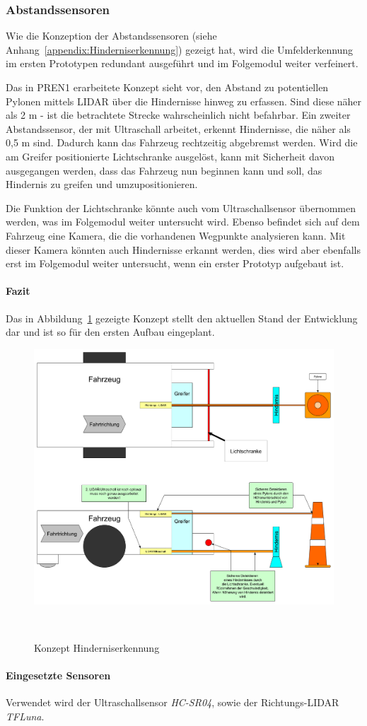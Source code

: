 \documentclass[main.tex]{subfiles} %
\begin{document}

\subsubsection{Abstandssensoren}

Wie die Konzeption der Abstandssensoren (siehe
Anhang~\ref{appendix:Hinderniserkennung}) gezeigt hat, wird die Umfelderkennung
im ersten Prototypen redundant ausgeführt und im Folgemodul weiter verfeinert.

Das in PREN1 erarbeitete Konzept sieht vor, den Abstand zu potentiellen Pylonen
mittels LIDAR über die Hindernisse hinweg zu erfassen. Sind diese näher als 2 m
- ist die betrachtete Strecke wahrscheinlich nicht befahrbar. Ein zweiter
Abstandssensor, der mit Ultraschall arbeitet, erkennt Hindernisse, die näher
als 0,5 m sind. Dadurch kann das Fahrzeug rechtzeitig abgebremst werden. Wird
die am Greifer positionierte Lichtschranke ausgelöst, kann mit Sicherheit davon
ausgegangen werden, dass das Fahrzeug nun beginnen kann und soll, das Hindernis
zu greifen und umzupositionieren.

Die Funktion der Lichtschranke könnte auch vom Ultraschallsensor übernommen
werden, was im Folgemodul weiter untersucht wird. Ebenso befindet sich auf dem
Fahrzeug eine Kamera, die die vorhandenen Wegpunkte analysieren kann. Mit
dieser Kamera könnten auch Hindernisse erkannt werden, dies wird aber ebenfalls
erst im Folgemodul weiter untersucht, wenn ein erster Prototyp aufgebaut ist.

\paragraph{Fazit} 
Das in Abbildung~\ref{fig:Konzept_Hinderniserkennung} gezeigte Konzept stellt
den aktuellen Stand der Entwicklung dar und ist so für den ersten Aufbau
eingeplant.

\begin{figure}[H]
    \centering
    \includegraphics[width=0.75\linewidth]{./fig_Abstandssensor/Konzept_Hinderniserkennung.pdf}
    \caption{Konzept Hinderniserkennung}~\label{fig:Konzept_Hinderniserkennung}
\end{figure}

\paragraph{Eingesetzte Sensoren}
Verwendet wird der Ultraschallsensor \textit{HC-SR04}, sowie der
Richtungs-LIDAR \textit{TFLuna}.
\end{document}
